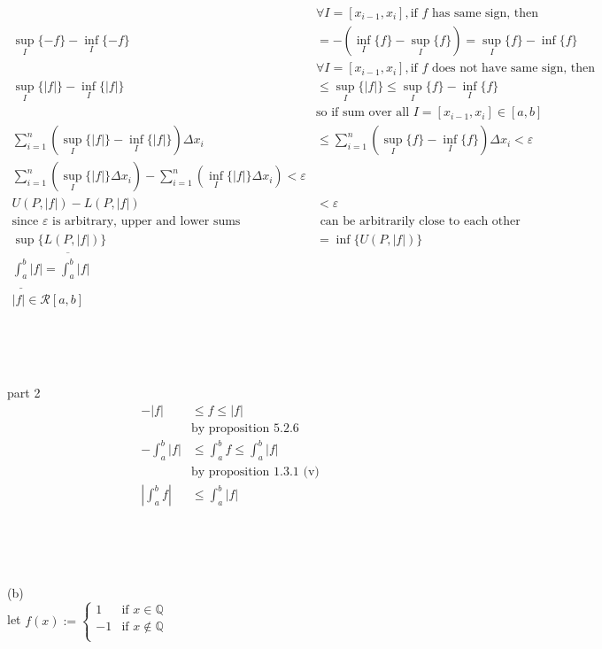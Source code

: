 \documentclass[12pt, border = 4pt, multi]{article} %
\begin{document}
\begin{align*}
&\forall I = [x_{i - 1}, x_i], \text{if $f$ has same sign, then}\\
\sup_I\{-f\} - \inf_I\{-f\} &= -\left(\inf_I\{f\} - \sup_I\{f\}\right) = \sup_I\{f\} - \inf\{f\}\\
&\forall I = [x_{i - 1}, x_i], \text{if $f$ does not have same sign, then}\\
\sup_I\{|f|\} - \inf_I\{|f|\} &\leq \sup_I\{|f|\} \leq \sup_I\{f\} - \inf_I\{f\}\\
&\text{so if sum over all } I = [x_{i - 1}, x_i] \in [a, b]\\
\sum_{i = 1} ^ n\left(\sup_I\{|f|\} - \inf_I\{|f|\}\right)\Delta x_i &\leq \sum_{i = 1} ^ n\left(\sup_I\{f\} - \inf_I\{f\}\right)\Delta x_i < \varepsilon\\
\sum_{i = 1} ^ n(\sup_I\{|f|\}\Delta x_i) - \sum_{i = 1} ^ n(\inf_I\{|f|\}\Delta x_i) < \varepsilon\\
U(P, |f|) - L(P, |f|) &< \varepsilon\\
\text{since $\varepsilon$ is arbitrary, upper and lower sums} &\text{ can be arbitrarily close to each other}\\
\sup\{L(P, |f|)\} &= \inf\{U(P, |f|)\}\\
\underline{\int_a ^ b} |f| = \overline{\int_a ^ b} |f|\\
|f| \in \mathscr{R}[a, b]\\
\end{align*}
\\
\\
\\
\\
part 2
\begin{align*}
-|f| &\leq f \leq |f|\\
&\text{by proposition 5.2.6}\\
-\int_a ^ b |f| &\leq \int_a ^ b f \leq \int_a ^ b |f|\\
&\text{by proposition 1.3.1 (v)}\\
\left|\int_a ^ b f\right| &\leq \int_a ^ b |f|\\
\end{align*}
\\
\\
\\
\\
(b)\\
let $f(x) :=
\begin{cases}
1 & \text{if } x \in \mathbb{Q}\\
-1 &\text{if } x \not\in \mathbb{Q}\\
\end{cases}$
\end{document}

